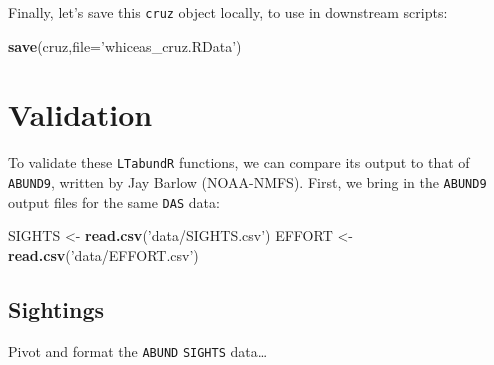 \documentclass[
]{book}
\newenvironment{Shaded}{\begin{snugshade}}{\end{snugshade}}
\newcommand{\DataTypeTok}[1]{\textcolor[rgb]{0.13,0.29,0.53}{#1}}
\newcommand{\DecValTok}[1]{\textcolor[rgb]{0.00,0.00,0.81}{#1}}
\newcommand{\KeywordTok}[1]{\textcolor[rgb]{0.13,0.29,0.53}{\textbf{#1}}}
\newcommand{\NormalTok}[1]{#1}
\newcommand{\OperatorTok}[1]{\textcolor[rgb]{0.81,0.36,0.00}{\textbf{#1}}}
\newcommand{\StringTok}[1]{\textcolor[rgb]{0.31,0.60,0.02}{#1}}
\begin{document}
Finally, let's save this \texttt{cruz} object locally, to use in downstream scripts:

\begin{Shaded}
\begin{Highlighting}[]
\KeywordTok{save}\NormalTok{(cruz,}\DataTypeTok{file=}\StringTok{'whiceas_cruz.RData'}\NormalTok{)}
\end{Highlighting}
\end{Shaded}

\hypertarget{validation}{%
\section*{Validation}\label{validation}}

To validate these \texttt{LTabundR} functions, we can compare its output to that of \texttt{ABUND9}, written by Jay Barlow (NOAA-NMFS). First, we bring in the \texttt{ABUND9} output files for the same \texttt{DAS} data:

\begin{Shaded}
\begin{Highlighting}[]
\NormalTok{SIGHTS <-}\StringTok{ }\KeywordTok{read.csv}\NormalTok{(}\StringTok{'data/SIGHTS.csv'}\NormalTok{)}
\NormalTok{EFFORT <-}\StringTok{ }\KeywordTok{read.csv}\NormalTok{(}\StringTok{'data/EFFORT.csv'}\NormalTok{)}
\end{Highlighting}
\end{Shaded}

\hypertarget{sightings}{%
\subsection*{Sightings}\label{sightings}}

Pivot and format the \texttt{ABUND} \texttt{SIGHTS} data\ldots{}

\begin{Shaded}
\end{Shaded}
\end{document}
